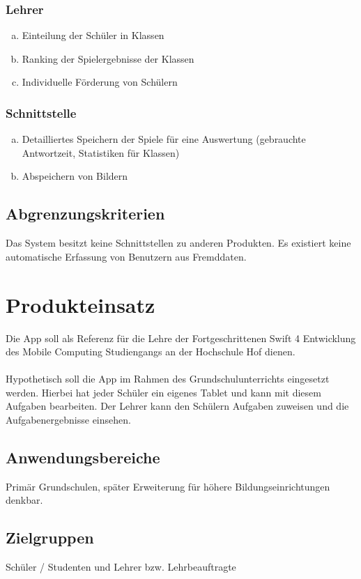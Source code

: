 \subsubsection{Lehrer}
\begin{enumerate}[a)]
\item Einteilung der Schüler in Klassen
\item Ranking der Spielergebnisse der Klassen
\item Individuelle Förderung von Schülern
\end{enumerate}


\subsubsection{Schnittstelle}
\begin{enumerate}[a)]
\item Detailliertes Speichern der Spiele für eine Auswertung (gebrauchte Antwortzeit, Statistiken für Klassen)
\item Abspeichern von Bildern
\end{enumerate}


\subsection{Abgrenzungskriterien}
Das System besitzt keine Schnittstellen zu anderen Produkten.
Es existiert keine automatische Erfassung von Benutzern aus Fremddaten.

\section{Produkteinsatz}
Die App soll als Referenz für die Lehre der Fortgeschrittenen Swift 4 Entwicklung des Mobile Computing Studiengangs an der Hochschule Hof dienen.\\
\\
Hypothetisch soll die App im Rahmen des Grundschulunterrichts eingesetzt werden. Hierbei hat jeder Schüler ein eigenes Tablet und kann mit diesem Aufgaben bearbeiten. Der Lehrer kann den Schülern Aufgaben zuweisen und die Aufgabenergebnisse einsehen.  

\subsection{Anwendungsbereiche}
Primär Grundschulen, später Erweiterung für höhere Bildungseinrichtungen denkbar. 

\subsection{Zielgruppen}
Schüler / Studenten und Lehrer bzw. Lehrbeauftragte

